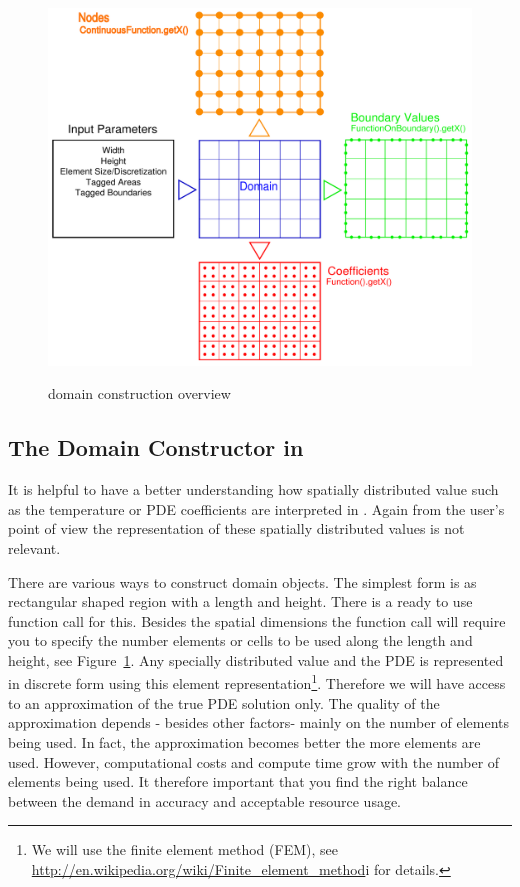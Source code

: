 \begin{figure}[t]
 \centering
   \includegraphics[width=6in]{figures/functionspace.pdf}
   \label{fig:fs}
   \caption{\esc domain construction overview}
\end{figure}

\subsection{The Domain Constructor in \esc}
\label{ss:domcon}
It is helpful to have a better understanding how spatially distributed value such as the temperature or PDE coefficients are interpreted in \esc. Again
from the user's point of view the representation of these spatially distributed values is not relevant. 

There are various ways to construct domain objects. The simplest form is as rectangular shaped region with a length and height. There is
a ready to use function call for this. Besides the spatial dimensions the function call will require you to specify the number
elements or cells to be used along the length and height, see Figure~\ref{fig:fs}. Any specially distributed value 
and the PDE is represented in discrete form using this element representation\footnote{We will use the finite element method (FEM), see \url{http://en.wikipedia.org/wiki/Finite_element_method}i for details.}. Therefore we will have access to an approximation of the true PDE solution only. 
The quality of the approximation depends - besides other factors- mainly on the number of elements being used. In fact, the 
approximation becomes better the more elements are used. However, computational costs and compute time grow with the number of
elements being used. It therefore important that you find the right balance between the demand in accuracy and acceptable resource usage.

